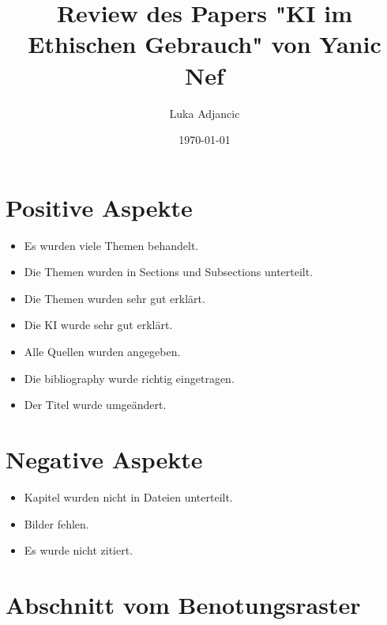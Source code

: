 \documentclass{article}
\title{Review des Papers "KI im Ethischen Gebrauch" von Yanic Nef}
\author{Luka Adjancic}
\date{\today}
\begin{document}
\maketitle


\newpage

\section{Positive Aspekte}

\begin{itemize}
    \item Es wurden viele Themen behandelt.
    \item Die Themen wurden in Sections und Subsections unterteilt.
    \item Die Themen wurden sehr gut erklärt.
    \item Die KI wurde sehr gut erklärt.
    \item Alle Quellen wurden angegeben.
    \item Die bibliography wurde richtig eingetragen.
    \item Der Titel wurde umgeändert.
\end{itemize}

\section{Negative Aspekte}

\begin{itemize}
    \item Kapitel wurden nicht in Dateien unterteilt.
    \item Bilder fehlen.
    \item Es wurde nicht zitiert.
\end{itemize}

\section{Abschnitt vom Benotungsraster}
\end{document}
